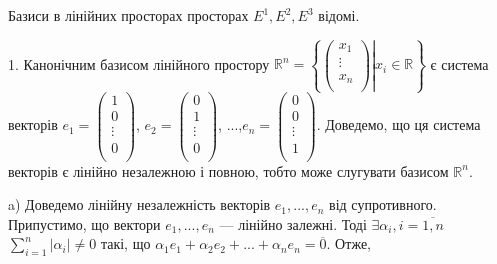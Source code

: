 \begin{example}
Базиси в лінійних просторах просторах $E^1, E^2, E^3$ відомі.

1. Канонічним базисом лінійного простору $\mathbb{R}^n = \left\{\left.\begin{pmatrix}
		x_1  \\
		\vdots  \\
		x_n  \\
	\end{pmatrix}\right| x_i \in \mathbb{R}\right\}$ є система
	векторів $e_1 = \begin{pmatrix}
		1  \\
		0  \\
		\vdots  \\
		0  \\
	\end{pmatrix}$, $e_2 = \begin{pmatrix}
		0  \\
		1  \\
		\vdots  \\
		0  \\
	\end{pmatrix}$, ...,$e_n = \begin{pmatrix}
		0  \\
		0  \\
		\vdots  \\
		1  \\
	\end{pmatrix}$. Доведемо, що ця система векторів є
лінійно незалежною і повною, тобто може слугувати базисом $\mathbb{R}^n$.

a) Доведемо лінійну незалежність векторів $e_1, ..., e_n$ від супротивного.
Припустимо, що вектори $e_1, ..., e_n$ --- лінійно залежні. Тоді
$\exists \alpha_i, i = \overline{1,n}$ $\sum\limits_{i=1}^n |\alpha_i| \neq 0$ такі, що $\alpha_1 e_1 + \alpha_2 e_2 + ... + \alpha_n e_n = \overline{0}$. Отже,


\end{example}
